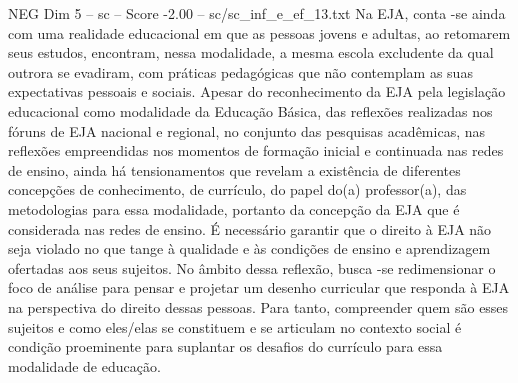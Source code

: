 \begin{textsample}{NEG Dim 5 – sc – Score -2.00 – sc/sc\_inf\_e\_ef\_13.txt}
Na EJA, conta -se ainda com uma realidade educacional em que as pessoas jovens e adultas, ao retomarem seus estudos, encontram, nessa modalidade, a mesma escola excludente da qual outrora se evadiram, com práticas pedagógicas que não contemplam as suas expectativas pessoais e sociais.
Apesar do reconhecimento da EJA pela legislação educacional como modalidade da Educação Básica, das reflexões realizadas nos fóruns de EJA nacional e regional, no conjunto das pesquisas acadêmicas, nas reflexões empreendidas nos momentos de formação inicial e continuada nas redes de ensino, ainda há tensionamentos que revelam a existência de diferentes concepções de conhecimento, de currículo, do papel do(a) professor(a), das metodologias para essa modalidade, portanto da concepção da EJA que é considerada nas redes de ensino.
É necessário garantir que o direito à EJA não seja violado no que tange à qualidade e às condições de ensino e aprendizagem ofertadas aos seus sujeitos.
No âmbito dessa reflexão, busca -se redimensionar o foco de análise para pensar e projetar um desenho curricular que responda à EJA na perspectiva do direito dessas pessoas.
Para tanto, compreender quem são esses sujeitos e como eles/elas se constituem e se articulam no contexto social é condição proeminente para suplantar os desafios do currículo para essa modalidade de educação.

\end{textsample}
